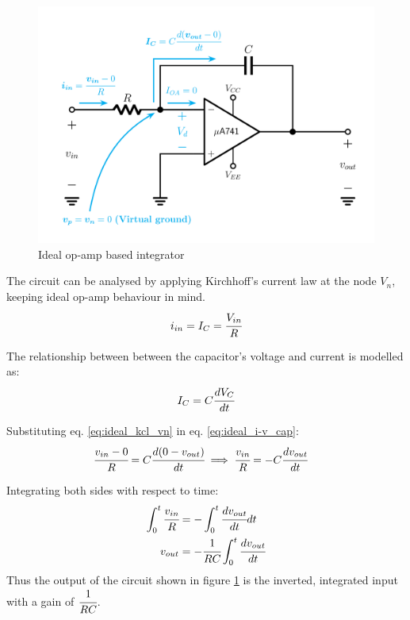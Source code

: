 \documentclass[12pt, titlepage]{article}
\theoremstyle{definition}
\begin{document}
    \begin{figure}[h]
      \centering
      \includegraphics[scale=0.25]{images/ideal_integrator.png}
      \caption{Ideal op-amp based integrator}
      \label{fig:theoretical_ideal_integrator}
    \end{figure}

    The circuit can be analysed by applying Kirchhoff's current law at the node $V_n$, keeping ideal op-amp behaviour in mind.
    \begin{equation}\label{eq:ideal_kcl_vn}
      i_{in} = I_C = \cfrac{V_{in}}{R}
    \end{equation}

    The relationship between between the capacitor's voltage and current is modelled as:
    \begin{equation}\label{eq:ideal_i-v_cap}
      I_C = C\cfrac{dV_C}{dt}
    \end{equation}

    Substituting eq. \ref{eq:ideal_kcl_vn} in eq. \ref{eq:ideal_i-v_cap}:
    \begin{align*}
      \cfrac{v_{in} - 0}{R} &= C\cfrac{d(0 - v_{out})}{dt}
      \implies \cfrac{v_{in}}{R} = -C\cfrac{dv_{out}}{dt}
    \end{align*}

    Integrating both sides with respect to time:
    \begin{align*}
      \int_0^t {\cfrac{v_{in}}{R}} &= - \int_0^t {\cfrac{dv_{out}}{dt}dt} \\
      v_{out} &= -\cfrac{1}{RC} \int_0^t {\cfrac{dv_{out}}{dt}}
    \end{align*}
    Thus the output of the circuit shown in figure \ref{fig:theoretical_ideal_integrator} is the inverted, integrated input with a gain of $\cfrac{1}{RC}$.
\end{document}
